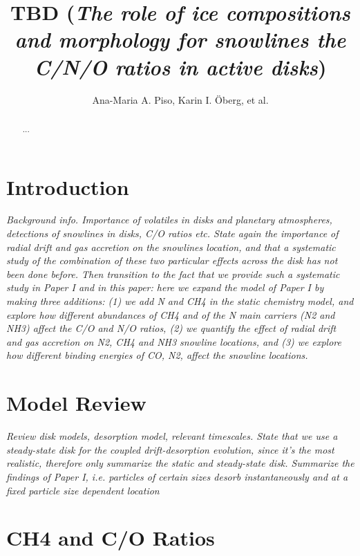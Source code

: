 \documentclass[apj]{emulateapj}
\newcommand{\emgr}[1]{\emph{ \color{gray} #1}}
\begin{document}


\title{TBD (\textit{The role of ice compositions and morphology for snowlines the C/N/O ratios in active disks})}

\author{Ana-Maria A. Piso, Karin I. \"Oberg, et al. } %


\begin{abstract}
...
\end{abstract}

\section{Introduction}

\emgr{Background info. Importance of volatiles in disks and planetary atmospheres, detections of snowlines in disks, C/O ratios etc. State again the importance of radial drift and gas accretion on the snowlines location, and that a systematic study of the combination of these two particular effects across the disk has not been done before. Then transition to the fact that we provide such a systematic study in Paper I and in this paper: here we expand the model of Paper I by making three additions: (1) we add N and CH4 in the static chemistry model, and explore how different abundances of CH4 and of the N main carriers (N2 and NH3) affect the C/O  and N/O ratios, (2) we quantify the effect of radial drift and gas accretion on N2, CH4 and NH3 snowline locations, and (3) we explore how different binding energies of CO, N2, affect the snowline locations.}

\section{Model Review}

\emgr{Review disk models, desorption model, relevant timescales. State that we use a steady-state disk for the coupled drift-desorption evolution, since it's the most realistic, therefore only summarize the static and steady-state disk. Summarize the findings of Paper I, i.e. particles of certain sizes desorb instantaneously and at a fixed particle size dependent location}

\section{CH4 and C/O Ratios}
\end{document}
